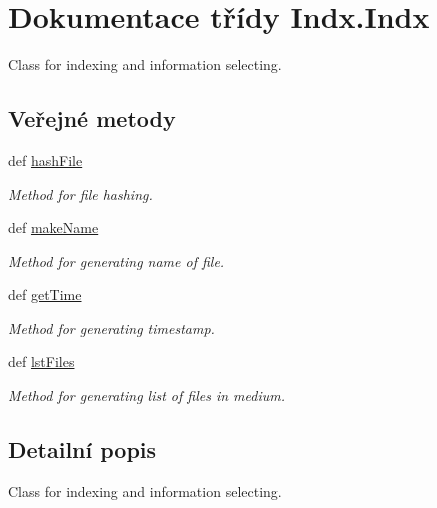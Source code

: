 \hypertarget{classIndx_1_1Indx}{\section{Dokumentace třídy Indx.\-Indx}
\label{classIndx_1_1Indx}
}


Class for indexing and information selecting.  


\subsection*{Veřejné metody}
\begin{DoxyCompactItemize}
\item 
def \hyperlink{classIndx_1_1Indx_ae470547083e5bb49949c3a2578af4140}{hash\-File}
\begin{DoxyCompactList}\small\item\em Method for file hashing. \end{DoxyCompactList}\item 
def \hyperlink{classIndx_1_1Indx_a4b7a4ce268afe5074da5e82d1f8eb606}{make\-Name}
\begin{DoxyCompactList}\small\item\em Method for generating name of file. \end{DoxyCompactList}\item 
def \hyperlink{classIndx_1_1Indx_a462f189faaca04aec8b10b04d12ca885}{get\-Time}
\begin{DoxyCompactList}\small\item\em Method for generating timestamp. \end{DoxyCompactList}\item 
def \hyperlink{classIndx_1_1Indx_a9944c7978590e48746130415cd919895}{lst\-Files}
\begin{DoxyCompactList}\small\item\em Method for generating list of files in medium. \end{DoxyCompactList}\end{DoxyCompactItemize}


\subsection{Detailní popis}
Class for indexing and information selecting. 

